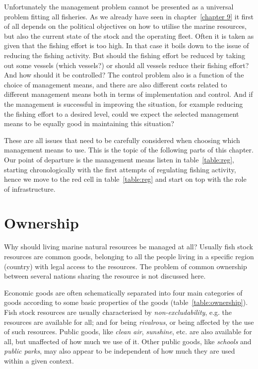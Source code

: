 \documentclass[11pt,fleqn]{book} %
\begin{document}
Unfortunately the management problem cannot be presented as a universal problem fitting all fisheries. As we already have seen in chapter~\ref{chapter 9} it first of all depends on the political objectives on how to utilise the marine resources, but also the current state of the stock and the operating fleet. Often it is taken as given that the fishing effort is too high. In that case it boils down to the issue of reducing the fishing activity. But should the fishing effort be reduced by taking out some vessels (which vessels?) or should all vessels reduce their fishing effort? And how should it be controlled? The control problem also is a function of the choice of management means, and there are also different costs related to different management means both in terms of implementation and control. And if the management is successful in improving the situation, for example reducing the fishing effort to a desired level, could we expect the selected management means to be equally good in maintaining this situation?

These are all issues that need to be carefully considered when choosing which management means to use. This is the topic of the following parts of this chapter. Our point of departure is the management means listen in table~\ref{table:reg}, starting chronologically with the first attempts of regulating fishing activity, hence we move to the red cell in table~\ref{table:reg} and start on top with the role of infrastructure.

\section{Ownership} \label{ownership}

Why should living marine natural resources be managed at all? Usually fish stock resources are common goods, belonging to all the people living in a specific region (country) with legal access to the resources. The problem of common ownership between several nations sharing the resource is not discussed here.

Economic goods are often schematically separated into four main categories of goods according to some basic properties of the goods (table~\ref{table:ownership}). Fish stock resources are usually characterised by \textit{non-excludability}, e.g. the resources are available for all; and for being \textit{rivalrous}, or being affected by the use of such resources. Public goods, like \textit{clean air}, \textit{sunshine}, etc. are also available for all, but unaffected of how much we use of it. Other public goods, like \textit{schools} and \textit{public parks}, may also appear to be independent of how much they are used within a given context. 
\end{document}
